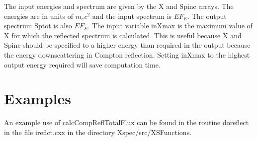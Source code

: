 \documentclass[11pt]{book}
\begin{document}
The input energies and spectrum are given by the X and Spinc
arrays. The energies are in units of $m_e c^2$ and the input spectrum
is $E F_E$. The output spectrum Sptot is also $E F_E$. The input
variable inXmax is the maximum value of X for which the reflected
spectrum is calculated. This is useful because X and Spinc should be
specified to a higher energy than required in the output because the
energy downscattering in Compton reflection. Setting inXmax to the
highest output energy required will save computation time.

\section{Examples}

An example use of calcCompReflTotalFlux can be found in the routine
doreflect in the file ireflct.cxx in the directory Xspec/src/XSFunctions.
\end{document}
